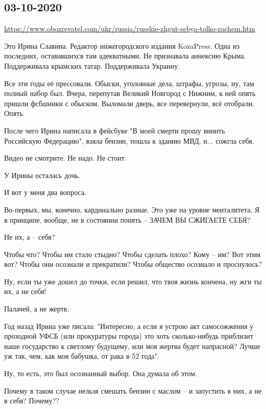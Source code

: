  
 

\subsection{03-10-2020}

\url{https://www.obozrevatel.com/ukr/russia/russkie-zhgut-sebya-tolko-zachem.htm}

Это Ирина Славина. Редактор нижегородского издания KozaPress. Одна из
последних, остававшихся там адекватными. Не признавала аннексию Крыма.
Поддерживала крымских татар. Поддерживала Украину.

Все эти годы её прессовали. Обыски, уголовные дела, штрафы, угрозы, ну, там
полный набор был. Вчера, перепутав Великий Новгород с Нижним, к ней опять
пришли фсбшники с обыском. Выломали дверь, все перевернули, всё отобрали.
Опять.

После чего Ирина написала в фейсбуке "В моей смерти прошу винить Российскую
Федерацию", взяла бензин, пошла к зданию МВД, и... сожгла себя.

Видео не смотрите. Не надо. Не стоит.

У Ирины осталась дочь.

И вот у меня два вопроса.

Во-первых, мы, конечно, кардинально разные. Это уже на уровне менталитета. Я в
принципе, вообще, не в состоянии понять – ЗАЧЕМ ВЫ СЖИГАЕТЕ СЕБЯ?

Не их, а – себя?

Чтобы что? Чтобы им стало стыдно? Чтобы сделать плохо? Кому – им? Вот этим вот?
Чтобы они осознали и прекратили? Чтобы общество осознало и проснулось?

Ну, если ты уже дошел до точки, если решил, что твоя жизнь кончена, ну жги ты
их, а не себя!

Палачей, а не жертв.

Год назад Ирина уже писала: "Интересно, а если я устрою акт самосожжения у
проходной УФСБ (или прокуратуры города) это хоть сколько-нибудь приблизит наше
государство к светлому будущему, или моя жертва будет напрасной? Лучше уж так,
чем, как моя бабушка, от рака в 52 года".

Ну, то есть, это был осознанный выбор. Она думала об этом.

Почему в таком случае нельзя смешать бензин с маслом – и запустить в них, а не
в себя? Почему??

